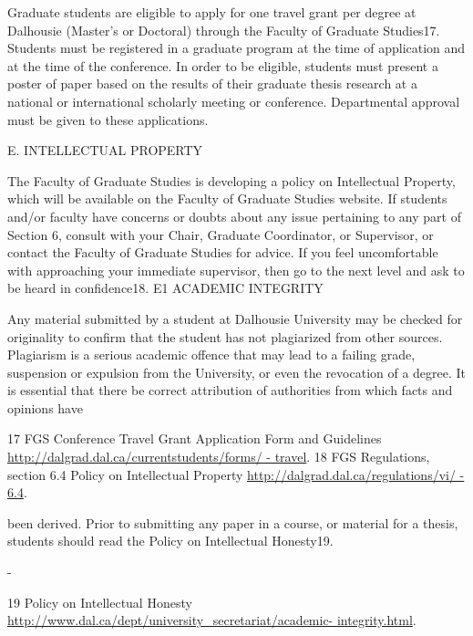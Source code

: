 \documentclass{article}
\newcommand\elink[1]{\url{#1}}
\begin{document}
Graduate students are eligible to apply for one travel grant per degree at Dalhousie (Master’s or Doctoral) through the Faculty of Graduate Studies17. Students must be registered in a graduate program at the time of application and at the time of the conference. In order to be eligible, students must present a poster of paper based on the results of their graduate thesis research at a national or international scholarly meeting or conference. Departmental approval must be given to these applications.


E.	INTELLECTUAL  PROPERTY

The Faculty of Graduate Studies is developing a policy on Intellectual Property, which will be available on the Faculty of Graduate Studies website.
If students and/or faculty have concerns or doubts about any issue pertaining to any part of Section 6, consult with your Chair, Graduate Coordinator, or Supervisor, or contact the Faculty of Graduate Studies for advice. If you feel uncomfortable with approaching your immediate supervisor, then go to the next level and ask to be heard in confidence18.
E1	ACADEMIC INTEGRITY

Any material submitted by a student at Dalhousie University may be checked for originality to confirm that the student has not plagiarized from other sources. Plagiarism is a serious academic offence that may lead to a failing grade, suspension or expulsion from the University, or even the revocation of a degree.  It is essential that there be correct attribution of authorities from which facts and opinions have




17 FGS Conference Travel Grant Application Form and Guidelines \elink{http://dalgrad.dal.ca/currentstudents/forms/ - travel}.
18 FGS Regulations, section 6.4 Policy on Intellectual Property \elink{http://dalgrad.dal.ca/regulations/vi/ - 6.4}.
 

been derived. Prior to submitting any paper in a course, or material for a thesis, students should read the Policy on Intellectual Honesty19.





-










































19 Policy on Intellectual Honesty \elink{http://www.dal.ca/dept/university_secretariat/academic- integrity.html}.
 
\end{document}
